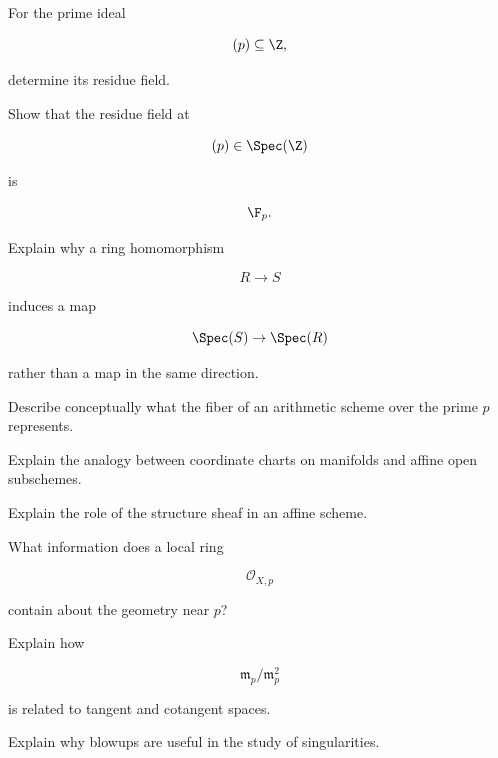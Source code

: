 \begin{exercise}[3]
For the prime ideal

\[
(p)\subseteq\Z,
\]

determine its residue field.
\end{exercise}

\begin{exercise}[3]
Show that the residue field at

\[
(p)\in\Spec(\Z)
\]

is

\[
\F_p.
\]
\end{exercise}

\begin{exercise}[3]
Explain why a ring homomorphism

\[
R\to S
\]

induces a map

\[
\Spec(S)\to\Spec(R)
\]

rather than a map in the same direction.
\end{exercise}

\begin{exercise}[3]
Describe conceptually what the fiber of an arithmetic scheme over the prime
\(p\) represents.
\end{exercise}

\begin{exercise}[3]
Explain the analogy between coordinate charts on manifolds and affine open
subschemes.
\end{exercise}

\begin{exercise}[3]
Explain the role of the structure sheaf in an affine scheme.
\end{exercise}

\begin{exercise}[3]
What information does a local ring

\[
\mathcal{O}_{X,p}
\]

contain about the geometry near \(p\)?
\end{exercise}

\begin{exercise}[3]
Explain how

\[
\mathfrak m_p/\mathfrak m_p^2
\]

is related to tangent and cotangent spaces.
\end{exercise}

\begin{exercise}[3]
Explain why blowups are useful in the study of singularities.
\end{exercise}

